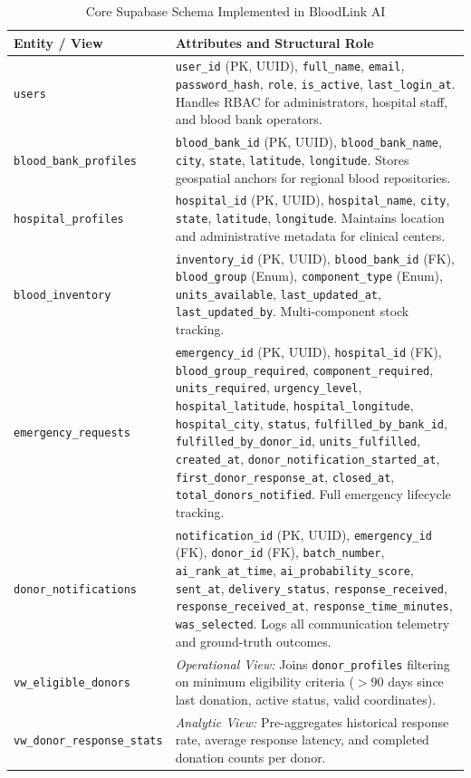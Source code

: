 \documentclass[conference]{IEEEtran}
\begin{document}
\begin{table}[H]
\caption{Core Supabase Schema Implemented in BloodLink AI}
\label{tab:schema}
\centering
\begin{tabular}{p{2.6cm}p{5.4cm}}
\toprule
\textbf{Entity / View} & \textbf{Attributes and Structural Role} \\
\midrule
\texttt{users} & \texttt{user\_id} (PK, UUID), \texttt{full\_name}, \texttt{email}, \texttt{password\_hash}, \texttt{role}, \texttt{is\_active}, \texttt{last\_login\_at}. Handles RBAC for administrators, hospital staff, and blood bank operators. \\
\addlinespace[0.3em]
\texttt{blood\_bank\_profiles} & \texttt{blood\_bank\_id} (PK, UUID), \texttt{blood\_bank\_name}, \texttt{city}, \texttt{state}, \texttt{latitude}, \texttt{longitude}. Stores geospatial anchors for regional blood repositories. \\
\addlinespace[0.3em]
\texttt{hospital\_profiles} & \texttt{hospital\_id} (PK, UUID), \texttt{hospital\_name}, \texttt{city}, \texttt{state}, \texttt{latitude}, \texttt{longitude}. Maintains location and administrative metadata for clinical centers. \\
\addlinespace[0.3em]
\texttt{blood\_inventory} & \texttt{inventory\_id} (PK, UUID), \texttt{blood\_bank\_id} (FK), \texttt{blood\_group} (Enum), \texttt{component\_type} (Enum), \texttt{units\_available}, \texttt{last\_updated\_at}, \texttt{last\_updated\_by}. Multi-component stock tracking. \\
\addlinespace[0.3em]
\texttt{emergency\_requests} & \texttt{emergency\_id} (PK, UUID), \texttt{hospital\_id} (FK), \texttt{blood\_group\_required}, \texttt{component\_required}, \texttt{units\_required}, \texttt{urgency\_level}, \texttt{hospital\_latitude}, \texttt{hospital\_longitude}, \texttt{hospital\_city}, \texttt{status}, \texttt{fulfilled\_by\_bank\_id}, \texttt{fulfilled\_by\_donor\_id}, \texttt{units\_fulfilled}, \texttt{created\_at}, \texttt{donor\_notification\_started\_at}, \texttt{first\_donor\_response\_at}, \texttt{closed\_at}, \texttt{total\_donors\_notified}. Full emergency lifecycle tracking. \\
\addlinespace[0.3em]
\texttt{donor\_notifications} & \texttt{notification\_id} (PK, UUID), \texttt{emergency\_id} (FK), \texttt{donor\_id} (FK), \texttt{batch\_number}, \texttt{ai\_rank\_at\_time}, \texttt{ai\_probability\_score}, \texttt{sent\_at}, \texttt{delivery\_status}, \texttt{response\_received}, \texttt{response\_received\_at}, \texttt{response\_time\_minutes}, \texttt{was\_selected}. Logs all communication telemetry and ground-truth outcomes. \\
\addlinespace[0.3em]
\texttt{vw\_eligible\_donors} & \textit{Operational View:} Joins \texttt{donor\_profiles} filtering on minimum eligibility criteria ($>90$ days since last donation, active status, valid coordinates). \\
\addlinespace[0.3em]
\texttt{vw\_donor\_response\_stats} & \textit{Analytic View:} Pre-aggregates historical response rate, average response latency, and completed donation counts per donor. \\
\bottomrule
\end{tabular}
\end{table}
\end{document}
